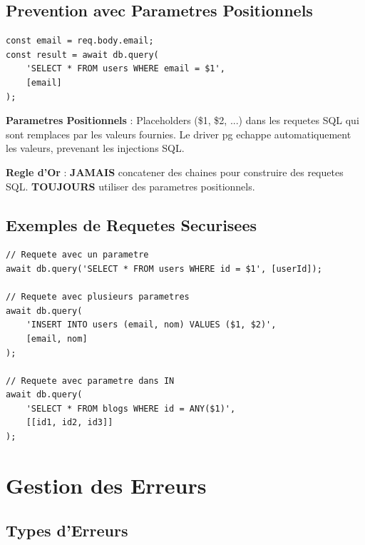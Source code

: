 \documentclass[a4paper,12pt]{book}
\begin{document}
\section{Prevention avec Parametres Positionnels}

\begin{lstlisting}[style=javascript, caption=Requete securisee avec parametres]
const email = req.body.email;
const result = await db.query(
    'SELECT * FROM users WHERE email = $1',
    [email]
);
\end{lstlisting}

\begin{definitionbox}
    \textbf{Parametres Positionnels} : Placeholders (\$1, \$2, ...) dans les requetes SQL qui sont remplaces par les valeurs fournies. Le driver pg echappe automatiquement les valeurs, prevenant les injections SQL.
\end{definitionbox}

\begin{bestpracticebox}
    \textbf{Regle d'Or} :
    \textbf{JAMAIS} concatener des chaines pour construire des requetes SQL. \textbf{TOUJOURS} utiliser des parametres positionnels.
\end{bestpracticebox}

\section{Exemples de Requetes Securisees}

\begin{lstlisting}[style=javascript, caption=Exemples de requetes securisees]
// Requete avec un parametre
await db.query('SELECT * FROM users WHERE id = $1', [userId]);

// Requete avec plusieurs parametres
await db.query(
    'INSERT INTO users (email, nom) VALUES ($1, $2)',
    [email, nom]
);

// Requete avec parametre dans IN
await db.query(
    'SELECT * FROM blogs WHERE id = ANY($1)',
    [[id1, id2, id3]]
);
\end{lstlisting}

\chapter{Gestion des Erreurs}

\section{Types d'Erreurs}
\end{document}
